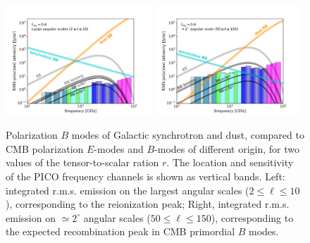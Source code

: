 \documentclass[PICOReport.tex]{subfiles}
\begin{document}
\begin{figure}
\includegraphics[width=0.49\textwidth]{images/sensitivity_vs_frequency_Jun29th_2018_large.pdf}
\includegraphics[width=0.49\textwidth]{images/sensitivity_vs_frequency_Jun29th_2018_2deg.pdf}
\vspace{-0.1in}
\caption{Polarization $B$ modes of Galactic synchrotron and dust, compared to CMB polarization $E$-modes and $B$-modes of different origin, for two values of the tensor-to-scalar ration $r$. The location and sensitivity of the PICO frequency channels is shown as vertical bands. Left: integrated r.m.s. emission on the largest angular scales ($2\leq \ell \leq 10$), corresponding to the reionization peak; Right, integrated r.m.s. emission on $\simeq 2^\circ$ angular scales ($50 \leq \ell \leq 150$), corresponding to the expected recombination peak in CMB primordial $B$ modes.}
\label{fig:pico-channels-and-fg}
\end{figure}
\end{document}

